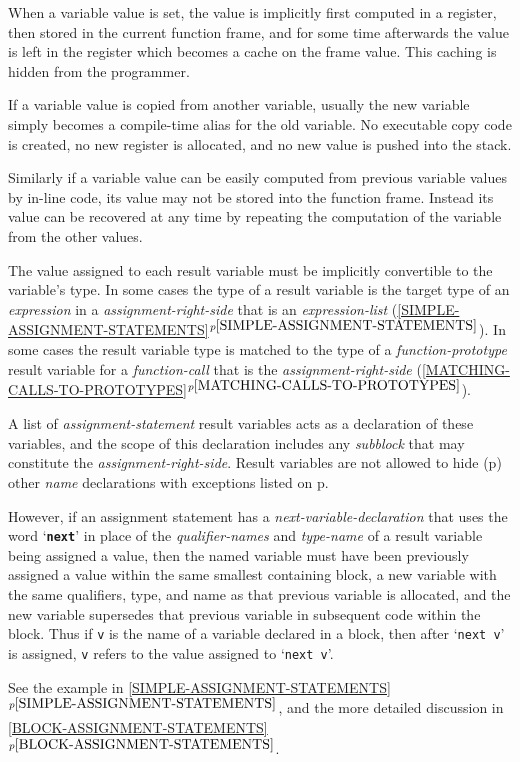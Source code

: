 \documentclass[12pt]{article}
\makeatletter
\newcommand{\TT}[1]{{\tt \bfseries #1}}
\newcommand{\ttkey}[1]{\TT{#1}\index{#1@{\tt #1}}}
\newcommand{\itemref}[1]{\ref{#1}$^{p\pageref{#1}}$}
\newcommand{\pagref}[1]{p\pageref{#1}}
\makeatother
\begin{document}
When a variable value is set, the value is implicitly first
computed in a register, then stored in the current function
frame, and for some time
afterwards the value is left in the register which becomes a cache
on the frame value.  This caching is hidden from the programmer.

If a variable value is copied from another variable, usually the
new variable simply becomes a compile-time alias for the old variable.
No executable copy code is created, no new register is allocated, and no new
value is pushed into the stack.

Similarly if a variable value can be easily computed from previous variable
values by in-line code, 
its value may not be stored into the function frame.  Instead its
value can be recovered at any time by repeating the computation
of the variable from the other values.

The value assigned to each result variable must be implicitly convertible to
the variable's type.  In some cases the type of a result variable is
the target type of an {\em expression} in a {\em assignment-right-side}
that is an {\em expression-list}
(\itemref{SIMPLE-ASSIGNMENT-STATEMENTS}).
In some cases the result variable type is matched to
the type of a {\em function-prototype} result variable
for a {\em function-call} that is the {\em assignment-right-side}
(\itemref{MATCHING-CALLS-TO-PROTOTYPES}).

A list of {\em assignment-statement}
result variables acts as a declaration of these variables,
and the scope of this declaration includes any {\em subblock} that may
constitute the {\em assignment-right-side}.
Result variables are not allowed to hide (\pagref{HIDE})
other {\em name} declarations with exceptions listed on
\pagref{HIDING-EXCEPTIONS}.

However, if an assignment statement has a {\em next-variable-declaration}
that uses the word `\ttkey{next}'\label{NEXT} in
place of the {\em qualifier-names} and {\em type-name}
of a result variable being assigned a value, then the named variable must
have been previously assigned a value within the same smallest containing block,
a new variable with the same qualifiers, type, and name
as that previous variable is allocated,
and the new variable supersedes that previous variable
in subsequent code within the block.  Thus if {\tt v} is the name
of a variable declared in a block, then after `{\tt next v}' is
assigned, {\tt v} refers to the value assigned to `{\tt next v}'.

See the example in \itemref{SIMPLE-ASSIGNMENT-STATEMENTS}, and
the more detailed discussion in 
\itemref{BLOCK-ASSIGNMENT-STATEMENTS}.
\end{document}
